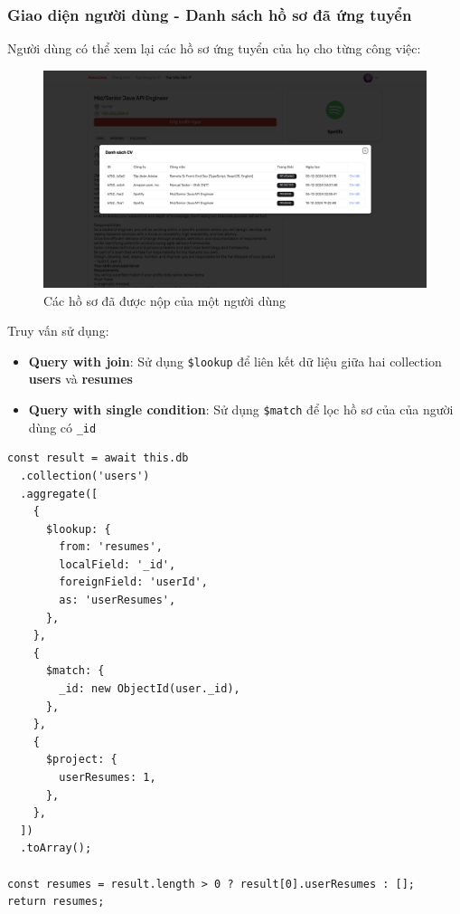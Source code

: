 \subsubsection{Giao diện người dùng - Danh sách hồ sơ đã ứng tuyển}

Người dùng có thể xem lại các hồ sơ ứng tuyển của họ cho từng công việc:

\begin{figure}[H]
    \centering
    \includegraphics[width=\linewidth]{DBMS-Application/Images/modal-list-cv.png}
    \caption{Các hồ sơ đã được nộp của một người dùng}
\end{figure}

Truy vấn sử dụng:
\begin{itemize}
    \item \textbf{Query with join}: Sử dụng \texttt{\$lookup} để liên kết dữ liệu giữa hai collection \textbf{users} và \textbf{resumes}

    \item \textbf{Query with single condition}: Sử dụng \texttt{\$match} để lọc hồ sơ của của người dùng có \texttt{\_id}
\end{itemize}

\begin{lstlisting}
const result = await this.db
  .collection('users')
  .aggregate([
    {
      $lookup: {
        from: 'resumes',
        localField: '_id',
        foreignField: 'userId',
        as: 'userResumes',
      },
    },
    {
      $match: {
        _id: new ObjectId(user._id),
      },
    },
    {
      $project: {
        userResumes: 1,
      },
    },
  ])
  .toArray();

const resumes = result.length > 0 ? result[0].userResumes : [];
return resumes;
\end{lstlisting}

